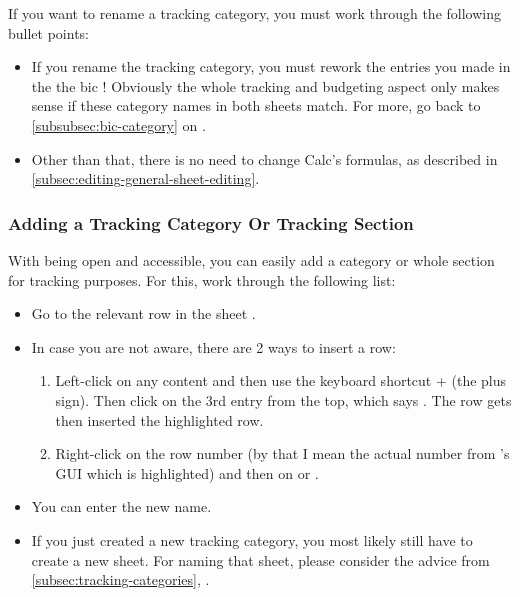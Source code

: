 If you want to rename a tracking category, you must work through the following bullet points:
\begin{itemize}
	\item If you rename the tracking category, you must rework the entries you made in the the  \ac{bic} !
	Obviously the whole tracking and budgeting aspect only makes sense if these category names in both sheets match.
	For more, go back to \autoref{subsubsec:bic-category} on .
	\item Other than that, there is no need to change Calc's formulas, as described in \autoref{subsec:editing-general-sheet-editing}.
\end{itemize}

\subsubsection{Adding a Tracking Category Or Tracking Section}
\label{subsubsec:adding-a-tracking-category-section}

With \tfn being open and accessible, you can easily add a category or whole section for tracking purposes.
For this, work through the following list:
\begin{itemize}
	\item Go to the relevant row in the sheet .
	\item In case you are not aware, there are 2 ways to insert a row:
	\begin{enumerate}
		\item Left-click on any content and then use the keyboard shortcut +\keystroke{+} (the plus sign).
		Then click on the 3rd entry from the top, which says .
		The row gets then inserted  the highlighted row.
		\item Right-click on the row number (by that I mean the actual number from \loc's GUI which is highlighted) and then on  or .
	\end{enumerate}
	\item You can enter the new name.
	\item If you just created a new tracking category, you most likely still have to create a new sheet.
	For naming that sheet, please consider the advice from \autoref{subsec:tracking-categories}, .
\end{itemize}

